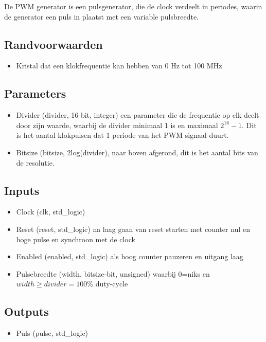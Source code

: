 \documentclass{article}
\begin{document}
De PWM generator is een pulsgenerator, die de clock verdeelt in periodes, waarin de generator een puls in plaatst met een variable pulsbreedte.
\subsection{Randvoorwaarden}
\begin{itemize}
\item Kristal dat een klokfrequentie kan hebben van 0 Hz tot 100 MHz 
\end{itemize}
\subsection{Parameters}
\begin{itemize}
\item Divider (divider, 16-bit, integer) een parameter die de frequentie op clk deelt door zijn waarde, waarbij de divider minimaal 1 is en maximaal $2^{16} -1$. Dit is het aantal klokpulsen dat 1 periode van het PWM signaal duurt.
\item Bitsize  (bitsize, 2log(divider), naar boven afgerond, dit is het aantal bits van de resolutie.

\end{itemize}
\subsection{Inputs}
\begin{itemize}
\item Clock (clk, std\_logic)
\item Reset (reset, std\_logic) na laag gaan van reset starten met counter nul en hoge pulse en synchroon met de clock
\item Enabled (enabled, std\_logic) als hoog counter pauzeren en uitgang laag
\item Pulsebreedte (width, bitsize-bit, unsigned) waarbij 0=niks en $width \geq divider = 100\%$ duty-cycle
\end{itemize}
\subsection{Outputs}
\begin{itemize}
\item Puls (pulse, std\_logic)
\end{itemize}
\end{document}
